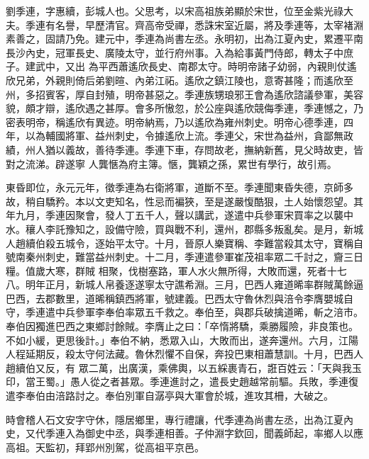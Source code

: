 
\begin{pinyinscope}

 劉季連，字惠續，彭城人也。父思考，以宋高祖族弟顯於宋世，位至金紫光祿大夫。季連有名譽，早歷清官。齊高帝受禪，悉誅宋室近屬，將及季連等，太宰褚淵素善之，固請乃免。建元中，季連為尚書左丞。永明初，出為江夏內史，累遷平南長沙內史，冠軍長史、廣陵太守，並行府州事。入為給事黃門侍郎，轉太子中庶子。建武中，又出
 為平西蕭遙欣長史、南郡太守。時明帝諸子幼弱，內親則仗遙欣兄弟，外親則倚后弟劉暄、內弟江祏。遙欣之鎮江陵也，意寄甚隆；而遙欣至州，多招賓客，厚自封殖，明帝甚惡之。季連族甥琅邪王會為遙欣諮議參軍，美容貌，頗才辯，遙欣遇之甚厚。會多所慠忽，於公座與遙欣競侮季連，季連憾之，乃密表明帝，稱遙欣有異迹。明帝納焉，乃以遙欣為雍州刺史。明帝心德季連，四年，以為輔國將軍、益州刺史，令據遙欣上流。季連父，宋世為益州，貪鄙無政績，州人猶以義故，善待季連。季連下車，存問故老，撫納新舊，見父時故吏，皆對之流涕。辟遂寧
 人龔愜為府主簿。愜，龔穎之孫，累世有學行，故引焉。



 東昏即位，永元元年，徵季連為右衛將軍，道斷不至。季連聞東昏失德，京師多故，稍自驕矜。本以文吏知名，性忌而褊狹，至是遂嚴愎酷狠，土人始懷怨望。其年九月，季連因聚會，發人丁五千人，聲以講武，遂遣中兵參軍宋買率之以襲中水。穰人李託豫知之，設備守險，買與戰不利，還州，郡縣多叛亂矣。是月，新城人趙續伯殺五城令，逐始平太守。十月，晉原人樂寶稱、李難當殺其太守，寶稱自號南秦州刺史，難當益州刺史。十二月，季連遣參軍崔茂祖率眾二千討之，齎三日糧。值歲大寒，群賊
 相聚，伐樹塞路，軍人水火無所得，大敗而還，死者十七八。明年正月，新城人帛養逐遂寧太守譙希淵。三月，巴西人雍道晞率群賊萬餘逼巴西，去郡數里，道晞稱鎮西將軍，號建義。巴西太守魯休烈與涪令李膺嬰城自守，季連遣中兵參軍李奉伯率眾五千救之。奉伯至，與郡兵破擒道晞，斬之涪市。奉伯因獨進巴西之東鄉討餘賊。李膺止之曰：「卒惰將驕，乘勝履險，非良策也。不如小緩，更思後計。」奉伯不納，悉眾入山，大敗而出，遂奔還州。六月，江陽人程延期反，殺太守何法藏。魯休烈懼不自保，奔投巴東相蕭慧訓。十月，巴西人趙續伯又反，有
 眾二萬，出廣漢，乘佛輿，以五綵裹青石，誑百姓云：「天與我玉印，當王蜀。」愚人從之者甚眾。季連進討之，遣長史趙越常前驅。兵敗，季連復遣李奉伯由涪路討之。奉伯別軍自潺亭與大軍會於城，進攻其柵，大破之。



 時會稽人石文安字守休，隱居鄉里，專行禮讓，代季連為尚書左丞，出為江夏內史，又代季連入為御史中丞，與季連相善。子仲淵字欽回，聞義師起，率鄉人以應高祖。天監初，拜郢州別駕，從高祖平京邑。




\end{pinyinscope}

